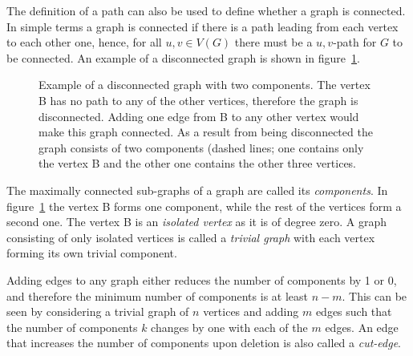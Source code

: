 The definition of a path can also be used to define whether a graph is
connected. In simple terms a graph is connected if there is a path leading from
each vertex to each other one, hence, for all $u,v\in V(G)$ there must be a
$u,v$-path for $G$ to be connected. An example of a disconnected graph is shown
in figure~\ref{fig:disconnectedgraph}.
%
\begin{figure}[htb]
    \centering
    \caption{Example of a disconnected graph with two components. The vertex B
    has no path to any of the other vertices, therefore the graph is
    disconnected. Adding one edge from B to any other vertex would make this
    graph connected. As a result from being disconnected the graph consists of
    two components (dashed lines; one contains only the vertex B and the other
    one contains the other three vertices.} \label{fig:disconnectedgraph}
\end{figure}
%
The maximally connected sub-graphs of a graph are called its
\textit{components}. In figure~\ref{fig:disconnectedgraph} the vertex B forms
one component, while the rest of the vertices form a second one. The vertex B is
an \textit{isolated vertex} as it is of degree zero. A graph consisting of only
isolated vertices is called a \textit{trivial graph} with each vertex forming
its own trivial component.

Adding edges to any graph either reduces the number of components by 1 or 0,
and therefore the minimum number of components is at least $n-m$. This can be
seen by considering a trivial graph of $n$ vertices and adding $m$ edges such
that the number of components $k$ changes by one with each of the $m$ edges. An
edge that increases the number of components upon deletion is also called a
\textit{cut-edge}.


